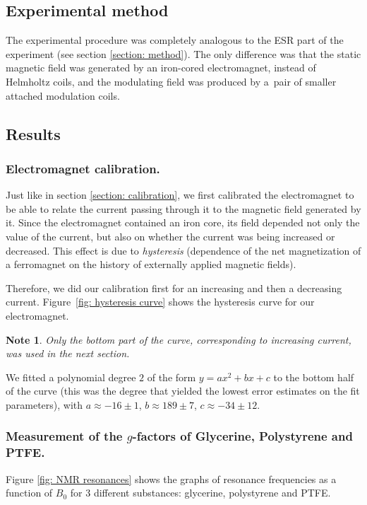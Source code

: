 \documentclass[a4paper]{jpconf}
\numberwithin{equation}{section}
\newtheorem*{note}{Note}
\begin{document}
\subsection{Experimental method}
The experimental procedure was completely analogous to the ESR part of the experiment (see section \ref{section: method}). The only difference was that the static magnetic field was generated by an iron-cored electromagnet, instead of Helmholtz coils, and the modulating field was produced by a~pair of smaller attached modulation coils.


\subsection{Results}
\subsubsection{Electromagnet calibration.}
Just like in section \ref{section: calibration}, we first calibrated the electromagnet to be able to relate the current passing through it to the magnetic field generated by it. Since the electromagnet contained an iron core, its field depended not only the value of the current, but also on whether the current was being increased or decreased. This effect is due to \emph{hysteresis} (dependence of the net magnetization of a ferromagnet on the history of externally applied magnetic fields). 

Therefore, we did our calibration first for an increasing and then a decreasing current. Figure~\ref{fig: hysteresis curve} shows the hysteresis curve for our electromagnet.
\begin{note}
	Only the bottom part of the curve, corresponding to increasing current, was used in the next section.
\end{note}
We fitted a polynomial degree $2$ of the form $y = ax^2 + bx + c$ to the bottom half of the curve (this was the degree that yielded the lowest error estimates on the fit parameters), with $a \approx -16 \pm 1$, $b \approx 189 \pm 7$, $c \approx -34 \pm 12.$

\subsubsection{Measurement of the $g$-factors of Glycerine, Polystyrene and PTFE.}

Figure \ref{fig: NMR resonances} shows the graphs of resonance frequencies as a function of $B_0$ for 3 different substances: glycerine, polystyrene and PTFE.
\end{document}
